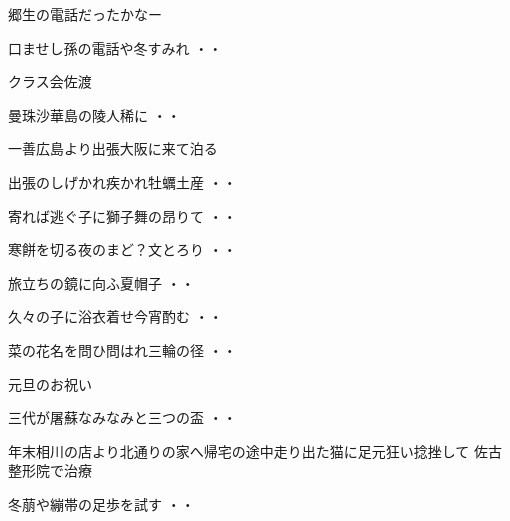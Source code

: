 郷生の電話だったかなー
\begin{shiika}口ませし孫の電話や冬すみれ
\hfill{・・}\end{shiika}
\vspace{0.6cm}
クラス会佐渡
\begin{shiika}曼珠沙華島の陵人稀に
\hfill{・・}\end{shiika}
\vspace{0.6cm}
一善広島より出張大阪に来て泊る
\begin{shiika}出張のしげかれ疾かれ牡蠣土産
\hfill{・・}\end{shiika}
\begin{shiika}寄れば逃ぐ子に獅子舞の昂りて
\hfill{・・}\end{shiika}
\begin{shiika}寒餅を切る夜のまど？文とろり
\hfill{・・}\end{shiika}
\begin{shiika}旅立ちの鏡に向ふ夏帽子
\hfill{・・}\end{shiika}
\begin{shiika}久々の子に浴衣着せ今宵酌む
\hfill{・・}\end{shiika}
\begin{shiika}菜の花名を問ひ問はれ三輪の径
\hfill{・・}\end{shiika}
\vspace{0.6cm}
元旦のお祝い
\begin{shiika}三代が屠蘇なみなみと三つの盃
\hfill{・・}\end{shiika}
\vspace{0.6cm}
年末相川の店より北通りの家へ帰宅の途中走り出た猫に足元狂い捻挫して
佐古整形院で治療
\begin{shiika}冬萠や繃帯の足歩を試す
\hfill{・・}\end{shiika}
\vspace{0.6cm}

